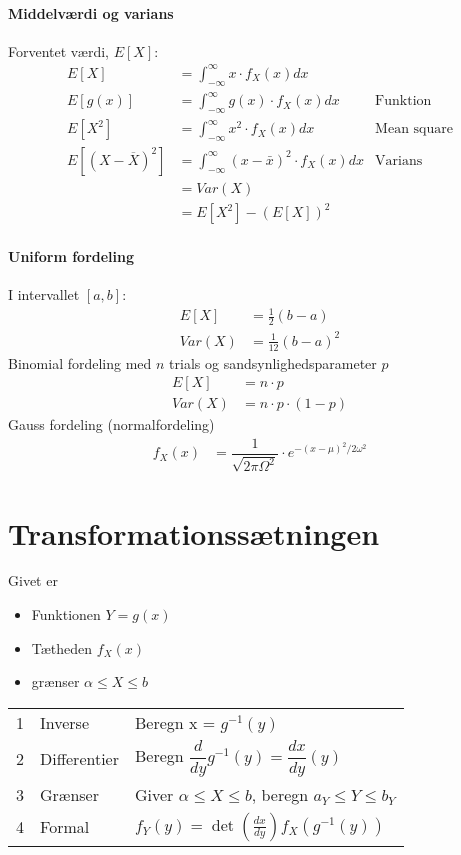 \documentclass[Main]{subfiles}
\begin{document}
\paragraph{Middelværdi og varians}
Forventet værdi, $E[X]$:
\begin{align*}
E[X] &= \int_{-\infty}^\infty x \cdot f_X(x) dx\\
E[g(x)] &= \int_{-\infty}^\infty g(x) \cdot f_X(x) dx & \text{Funktion}\\
E[X^2] &= \int_{-\infty}^\infty  x^2 \cdot f_X(x) dx & \text{Mean square}\\
E[(X-\overline{X})^2] &= \int_{-\infty}^\infty (x-\bar{x})^2 \cdot f_X(x) dx  & \text{Varians}\\
	&= Var(X)\\
	&= E[X^2]-(E[X])^2
\end{align*}



\paragraph{Uniform fordeling}
I intervallet $[a,b]$:
\begin{align*}
E[X] &= \frac{1}{2} (b-a)\\
Var(X) &= \frac{1}{12}(b-a)^2
\end{align*}
Binomial fordeling med $n$ trials og sandsynlighedsparameter $p$
\begin{align*}
E[X] &= n \cdot p\\
Var(X) &= n \cdot p \cdot (1-p)
\end{align*}
Gauss fordeling (normalfordeling)
\begin{align*}
f_X(x) &= \dfrac{1}{\sqrt{2 \pi \Omega^2}}\cdot e^{-(x-\mu)^2/{2\omega^2}}
\end{align*}

\section{Transformationssætningen}
Givet er 
\begin{itemize}
\item Funktionen $Y=g(x)$
\item Tætheden $f_X(x)$
\item grænser $\alpha\leq X \leq b$
\end{itemize}

\begin{tabular}{lll}
1 & Inverse & Beregn x = $g^{-1}(y)$\\
2 & Differentier & Beregn $\dfrac{d}{dy}g^{-1}(y) = \dfrac{dx}{dy}(y)$\\
3 & Grænser	& Giver $\alpha \leq X \leq b$, beregn $a_Y  \leq Y \leq b_Y$\\
4 & Formal & $f_Y(y) = \det(\frac{dx}{dy}) f_X(g^{-1} (y)) $
\end{tabular}
\end{document}
